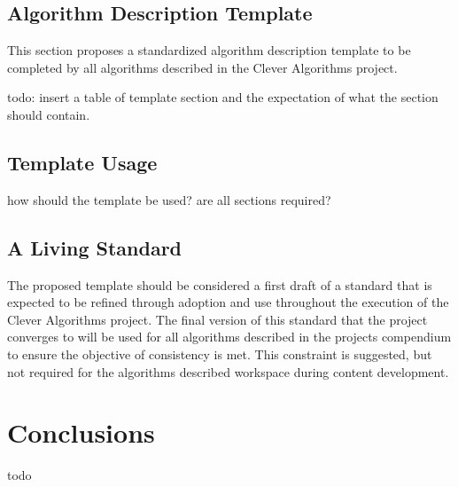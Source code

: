\documentclass[a4paper, 11pt]{article}
\begin{document}
\subsection{Algorithm Description Template}
This section proposes a standardized algorithm description template to be completed by all algorithms described in the Clever Algorithms project.

todo: insert a table of template section and the expectation of what the section should contain.

\subsection{Template Usage}
how should the template be used? are all sections required?

\subsection{A Living Standard}
The proposed template should be considered a first draft of a standard that is expected to be refined through adoption and use throughout the execution of the Clever Algorithms project. The final version of this standard that the project converges to will be used for all algorithms described in the projects compendium to ensure the objective of consistency is met. This constraint is suggested, but not required for the algorithms described workspace during content development.

\section{Conclusions}
\label{sec:conclusions}
todo



\end{document}
